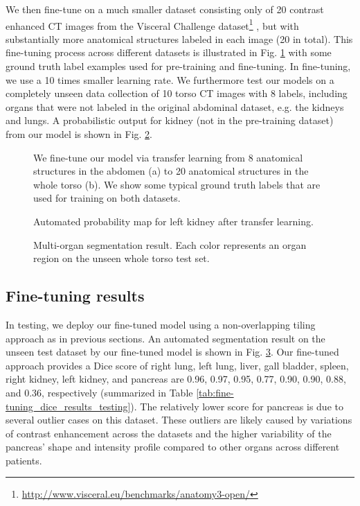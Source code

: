\documentclass[authoryear]{elsarticle}
\begin{document}
We then fine-tune on a much smaller dataset consisting only of 20 contrast enhanced CT images from the Visceral Challenge dataset\footnote{\url{http://www.visceral.eu/benchmarks/anatomy3-open/}} \citep{jimenez2016cloud}, but with substantially more anatomical structures labeled in each image (20 in total). This fine-tuning process across different datasets is illustrated in Fig. \ref{fig:fine-tuning} with some ground truth label examples used for pre-training and fine-tuning. In fine-tuning, we use a 10 times smaller learning rate. We furthermore test our models on a completely unseen data collection of 10 torso CT images with 8 labels, including organs that were not labeled in the original abdominal dataset, e.g. the kidneys and lungs. A probabilistic output for kidney (not in the pre-training dataset) from our model is shown in Fig. \ref{fig:fine-tuning_kidney}.
\begin{figure}[htb]
	\centering	
	\caption{We fine-tune our model via transfer learning from 8 anatomical structures in the abdomen (a) to 20 anatomical structures in the whole torso (b). We show some typical ground truth labels that are used for training on both datasets.}
	\label{fig:fine-tuning}
\end{figure}
\begin{figure}[htb]
	\centering	
	\hspace{1.5em}
	\caption{Automated probability map for left kidney after transfer learning.}
	\label{fig:fine-tuning_kidney}
\end{figure}
\begin{figure}[htb]
	\centering	
	\caption{Multi-organ segmentation result. Each color represents an organ region on the unseen whole torso test set.}
	\label{fig:fine-tuning-result}
\end{figure}
\subsection{Fine-tuning results}
In testing, we deploy our fine-tuned model using a non-overlapping tiling approach as in previous sections. An automated segmentation result on the unseen test dataset by our fine-tuned model is shown in Fig. \ref{fig:fine-tuning-result}. Our fine-tuned approach provides a Dice score of right lung, left lung, liver, gall bladder, spleen, right kidney, left kidney, and pancreas are 0.96, 0.97, 0.95, 0.77, 0.90, 0.90, 0.88, and 0.36, respectively (summarized in Table \ref{tab:fine-tuning_dice_results_testing}). The relatively lower score for pancreas is due to several outlier cases on this dataset. These outliers are likely caused by variations of contrast enhancement across the datasets and the higher variability of the pancreas’ shape and intensity profile compared to other organs across different patients. 
\end{document}

